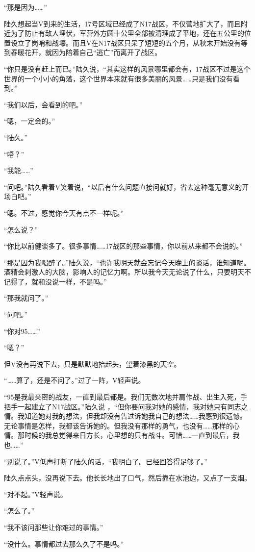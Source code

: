 “那是因为……”

陆久想起当V到来的生活，17号区域已经成了N17战区，不仅营地扩大了，而且附近为了防止有敌人埋伏，军营外方圆十公里全部被清理成了平地，还在五公里的位置设立了岗哨和战壕。而且V在N17战区只呆了短短的五个月，从秋末开始没有等到春暖花开，就因为陪着自己“逃亡”而离开了战区。

“你只是没有赶上而已。”陆久说，“其实这样的风景哪里都会有，17战区不过是这个世界的一个小小的角落，这个世界本来就有很多美丽的风景……只是我们没有看到。”

“我们以后，会看到的吧。”

“嗯，一定会的。”

“陆久。”

“唔？”

“我能……”

“问吧。”陆久看着V笑着说，“以后有什么问题直接问就好，省去这种毫无意义的开场白吧。”

“嗯。不过，感觉你今天有点不一样呢。”

“怎么说？”

“你比以前健谈多了。很多事情……17战区的那些事情，你以前从来都不会说的。”

“那是因为我喝醉了。”陆久说，“也许我明天就会忘记今天晚上的谈话，谁知道呢。酒精会刺激人的大脑，影响人的记忆力啊。所以我今天无论说了什么，只要明天不记得了，就和没说一样，不是吗。”

“那我就问了。”

“问吧。”

“你对95……”

“嗯？”

但V没有再说下去，只是默默地抬起头，望着漆黑的天空。

“……算了，还是不问了。”过了一阵，V轻声说。

“95是我最亲密的战友，一直到最后都是。我们无数次地并肩作战、出生入死，手把手一起建立了N17战区。”陆久说 ，“但你要问我对她的感情，我对她只有同志之情。我知道她对我的想法，但我却没有告过诉她我自己的想法……我感到很遗憾。无论事情是怎样，我都该告诉她的。但我没有那样的勇气，也没有……那样的心情。那时候的我总觉得来日方长，心里想的只有战斗。可惜……一直到最后，我也……”

“别说了。”V低声打断了陆久的话，“我明白了。已经回答得足够了。”

陆久点点头，没再说下去。他长长地出了口气，然后靠在水池边，又点了一支烟。

“对不起。”V轻声说。

“怎么了。”

“我不该问那些让你难过的事情。”

“没什么。事情都过去那么久了不是吗。”

